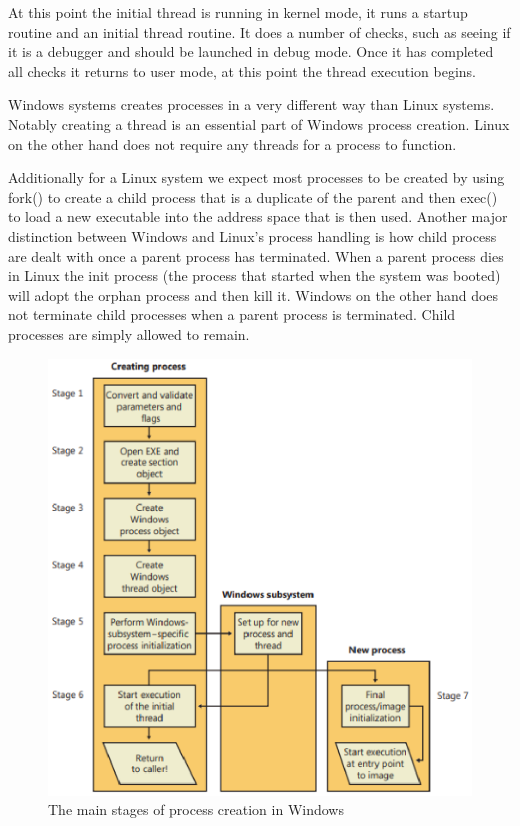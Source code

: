 \documentclass[letterpaper, 10pt, onecolumn, draftclsnofoot]{IEEEtran}
\begin{document}
At this point the initial thread is running in kernel mode, it runs a startup routine and an initial thread routine. It does a number of checks, such as seeing if it is a debugger and should be launched in debug mode. Once it has completed all checks it returns to user mode, at this point the thread execution begins.\cite{wi_p1}

Windows systems creates processes in a very different way than Linux systems. Notably creating a thread is an essential part of Windows process creation. Linux on the other hand does not require any threads for a process to function. 

Additionally for a Linux system we expect most processes to be created by using fork() to create a child process that is a duplicate of the parent and then exec() to load a new executable into  the address space that is then used.
Another major distinction between Windows and Linux's process handling is how child process are dealt with once a parent process has terminated. When a parent process dies in Linux the init process (the process that started when the system was booted) will adopt the orphan process and then kill it. Windows on the other hand does not terminate child processes when a parent process is terminated. Child processes are simply allowed to remain.\cite{wi_p1, linux}

\begin{figure}[!ht]
  \caption{The main stages of process creation in Windows\cite{wi_p1}}
  \includegraphics[scale=0.75]{wpd.eps}
\end{figure}
\end{document}
